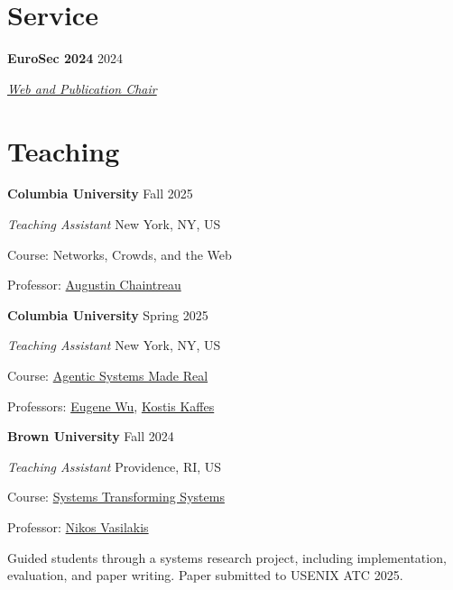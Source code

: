 \documentclass[margin,12pt]{resume}
\newcommand{\descriptionVSpace}{\vspace{0.5ex}\xspace}
\newcommand{\subsectionVSpace}{\vspace{3.5ex}\xspace}
\newcommand{\sectionVSpace}{\vspace{1ex}\xspace} %
\newcommand{\sectionVSpaceCorrection}{\vspace{-3.5ex}} %
\newcommand{\header}[1]{\textbf{#1}\xspace}
\newcommand{\institution}[1]{\header{#1}\xspace}
\newcommand{\place}[1]{#1\xspace}
\newcommand{\role}[1]{\textit{#1}\xspace}
\newcommand{\service}[1]{\header{#1}\xspace}
\newcommand{\singleDate}[1]{#1\xspace}
\newcommand{\stitle}[1]{#1:\xspace}
\newenvironment{rSubsection}{}{\par\subsectionVSpace}
\newenvironment{rSection}[1]{\sectionVSpaceCorrection\section{#1}\xspace}{\sectionVSpace\par}
\newenvironment{jobDuties}{\descriptionVSpace}{\par}
\begin{document}
\begin{resume}
\begin{rSection}{Service}
		\begin{rSubsection}
			\service{EuroSec 2024} \hfill 2024

			\role{\href{https://secopera.eu/eurosec-2024/}{Web and Publication Chair}}
		\end{rSubsection}
	\end{rSection}

	\begin{rSection}{Teaching}
		\begin{rSubsection}
			\institution{Columbia University} \hfill \singleDate{Fall 2025}

			\role{Teaching Assistant} \hfill \place{New York, NY, US}

			\stitle{Course} Networks, Crowds, and the Web %

			\stitle{Professor} \href{https://www.engineering.columbia.edu/faculty-staff/directory/augustin-chaintreau}{Augustin Chaintreau}
		\end{rSubsection}

		\begin{rSubsection}
			\institution{Columbia University} \hfill \singleDate{Spring 2025}

			\role{Teaching Assistant} \hfill \place{New York, NY, US}

			\stitle{Course} \href{https://w6113.github.io/}{Agentic Systems Made Real}

			\stitle{Professors} \href{https://www.cs.columbia.edu/~ewu/}{Eugene Wu}, \href{https://www.cs.columbia.edu/~kkaffes/index.html}{Kostis Kaffes}
		\end{rSubsection}

		\begin{rSubsection}
			\institution{Brown University} \hfill \singleDate{Fall 2024}

			\role{Teaching Assistant} \hfill \place{Providence, RI, US}

			\stitle{Course} \href{https://cs.brown.edu/courses/csci2952r/}{Systems Transforming Systems}

			\stitle{Professor} \href{https://nikos.vasilak.is}{Nikos Vasilakis}

			\begin{jobDuties}
				Guided students through a systems research project, including implementation, evaluation, and paper writing.
				Paper submitted to USENIX ATC 2025.
			\end{jobDuties}
		\end{rSubsection}


\end{rSection}
\end{resume}
\end{document}
